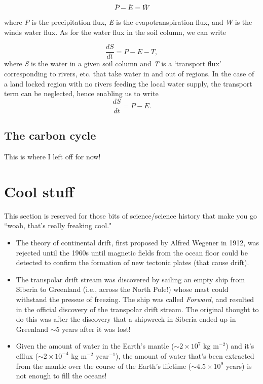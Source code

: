 \documentclass[11pt]{article}
\numberwithin{equation}{section}
\begin{document}
\begin{equation}
\bar{P} - \bar{E} = \bar{W}
\end{equation}

where \textit{P} is the precipitation flux, \textit{E} is the evapotranspiration flux, and \textit{W} is the winds water flux. As for the water flux in the soil column, we can write 

\begin{equation}
\dfrac{dS}{dt} = P - E - T,
\end{equation}
where \textit{S} is the water in a given soil column and \textit{T} is a `transport flux' corresponding to rivers, etc. that take water in and out of regions. In the case of a land locked region with no rivers feeding the local water supply, the transport term can be neglected, hence enabling us to write
\begin{equation}
\dfrac{dS}{dt} = P - E.
\end{equation}

\subsection{The carbon cycle}

This is where I left off for now! 

\section{Cool stuff}
This section is reserved for those bits of science/science history that make you go ``woah, that's really freaking cool." 
\begin{itemize}
\item The theory of continental drift, first proposed by Alfred Wegener in 1912, was rejected until the 1960s until magnetic fields from the ocean floor could be detected to confirm the formation of new tectonic plates (that cause drift).
\item The transpolar drift stream was discovered by sailing an empty ship from Siberia to Greenland (i.e., across the North Pole!) whose mast could withstand the pressue of freezing. The ship was called \textit{Forward}, and resulted in the official discovery of the transpolar drift stream. The original thought to do this was after the discovery that a shipwreck in Siberia ended up in Greenland $\sim$5 years after it was lost! 
\item Given the amount of water in the Earth’s mantle ($\sim 2 \times 10^7$ kg m$^{-2}$) and it’s efflux ($\sim 2 \times 10^{-4}$ kg m$^{-2}$ year$^{-1}$), the amount of water that’s been extracted from the mantle over the course of the Earth’s lifetime ($\sim 4.5 \times 10^9$ years) is not enough to fill the oceans! 
\end{itemize}
\end{document}
